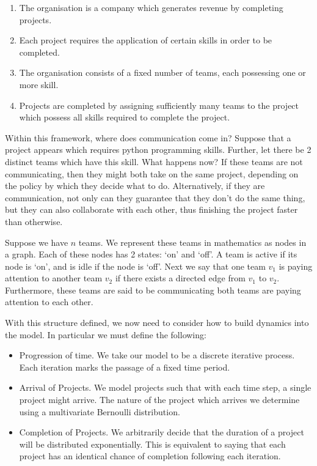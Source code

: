 \begin{enumerate}
	\item The organisation is a company which generates revenue by completing projects.
	
	\item Each project requires the application of certain skills in order to be completed.
	
	\item The organisation consists of a fixed number of teams, each possessing one or more skill.
	
	\item Projects are completed by assigning sufficiently many teams to the project which possess all skills required to complete the project.
\end{enumerate} 

Within this framework, where does communication come in? Suppose that a project appears which requires python programming skills. Further, let there be 2 distinct teams which have this skill. What happens now? If these teams are not communicating, then they might both take on the same project, depending on the policy by which they decide what to do. Alternatively, if they are communication, not only can they guarantee that they don't do the same thing, but they can also collaborate with each other, thus finishing the project faster than otherwise.

Suppose we have $n$ teams. We represent these teams in mathematics as nodes in a graph. Each of these nodes has 2 states: `on' and `off'. A team is active if its node is `on', and is idle if the node is `off'. Next we say that one team $v_1$ is paying attention to another team $v_2$ if there exists a directed edge from $v_1$ to $v_2$. Furthermore, these teams are said to be communicating both teams are paying attention to each other.

With this structure defined, we now need to consider how to build dynamics into the model. In particular we must define the following:

\begin{itemize}
	\item Progression of time. We take our model to be a discrete iterative process. Each iteration marks the passage of a fixed time period. 

	\item Arrival of Projects. We model projects such that with each time step, a single project might arrive. The nature of the project which arrives we determine using a multivariate Bernoulli distribution.
	
	\item Completion of Projects. We arbitrarily decide that the duration of a project will be distributed exponentially. This is equivalent to saying that each project has an identical chance of completion following each iteration.
\end{itemize}


